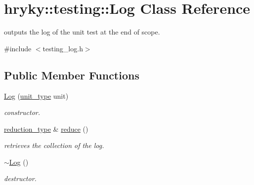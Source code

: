 \hypertarget{classhryky_1_1testing_1_1_log}{\section{hryky\-:\-:testing\-:\-:Log Class Reference}
\label{classhryky_1_1testing_1_1_log}
}


outputs the log of the unit test at the end of scope.  




{\ttfamily \#include $<$testing\-\_\-log.\-h$>$}

\subsection*{Public Member Functions}
\begin{DoxyCompactItemize}
\item 
\hypertarget{classhryky_1_1testing_1_1_log_a8349b66910585f9c6f523743c0f4a72b}{\hyperlink{classhryky_1_1testing_1_1_log_a8349b66910585f9c6f523743c0f4a72b}{Log} (\hyperlink{classhryky_1_1testing_1_1unit_1_1_base}{unit\-\_\-type} unit)}\label{classhryky_1_1testing_1_1_log_a8349b66910585f9c6f523743c0f4a72b}

\begin{DoxyCompactList}\small\item\em constructor. \end{DoxyCompactList}\item 
\hypertarget{classhryky_1_1testing_1_1_log_a771620257c6bc6fc1c3f1e997053f275}{\hyperlink{classhryky_1_1reduction_1_1_map}{reduction\-\_\-type} \& \hyperlink{classhryky_1_1testing_1_1_log_a771620257c6bc6fc1c3f1e997053f275}{reduce} ()}\label{classhryky_1_1testing_1_1_log_a771620257c6bc6fc1c3f1e997053f275}

\begin{DoxyCompactList}\small\item\em retrieves the collection of the log. \end{DoxyCompactList}\item 
\hypertarget{classhryky_1_1testing_1_1_log_a3c34d26e3b2e3a3c5dbca732f2f816bb}{\hyperlink{classhryky_1_1testing_1_1_log_a3c34d26e3b2e3a3c5dbca732f2f816bb}{$\sim$\-Log} ()}\label{classhryky_1_1testing_1_1_log_a3c34d26e3b2e3a3c5dbca732f2f816bb}

\begin{DoxyCompactList}\small\item\em destructor. \end{DoxyCompactList}\end{DoxyCompactItemize}


